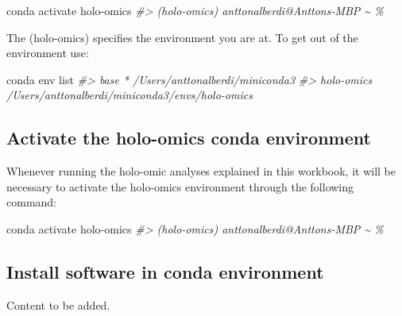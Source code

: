 \documentclass[
]{book}
\newenvironment{Shaded}{\begin{snugshade}}{\end{snugshade}}
\newcommand{\CommentTok}[1]{\textcolor[rgb]{0.56,0.35,0.01}{\textit{#1}}}
\newcommand{\ExtensionTok}[1]{#1}
\newcommand{\NormalTok}[1]{#1}
\begin{document}
\begin{Shaded}
\begin{Highlighting}[]
\ExtensionTok{conda}\NormalTok{ activate holo{-}omics}
\CommentTok{\#\textgreater{} (holo{-}omics) anttonalberdi@Anttons{-}MBP \textasciitilde{} \%}
\end{Highlighting}
\end{Shaded}

The (holo-omics) specifies the environment you are at. To get out of the environment use:

\begin{Shaded}
\begin{Highlighting}[]
\ExtensionTok{conda}\NormalTok{ env list}
\CommentTok{\#\textgreater{} base                  *  /Users/anttonalberdi/miniconda3}
\CommentTok{\#\textgreater{} holo{-}omics               /Users/anttonalberdi/miniconda3/envs/holo{-}omics}
\end{Highlighting}
\end{Shaded}

\hypertarget{activate-the-holo-omics-conda-environment}{%
\subsection*{Activate the holo-omics conda environment}\label{activate-the-holo-omics-conda-environment}}

Whenever running the holo-omic analyses explained in this workbook, it will be necessary to activate the holo-omics environment through the following command:

\begin{Shaded}
\begin{Highlighting}[]
\ExtensionTok{conda}\NormalTok{ activate holo{-}omics}
\CommentTok{\#\textgreater{} (holo{-}omics) anttonalberdi@Anttons{-}MBP \textasciitilde{} \%}
\end{Highlighting}
\end{Shaded}

\hypertarget{install-software-in-conda-environment}{%
\subsection*{Install software in conda environment}\label{install-software-in-conda-environment}}

Content to be added.
\end{document}
